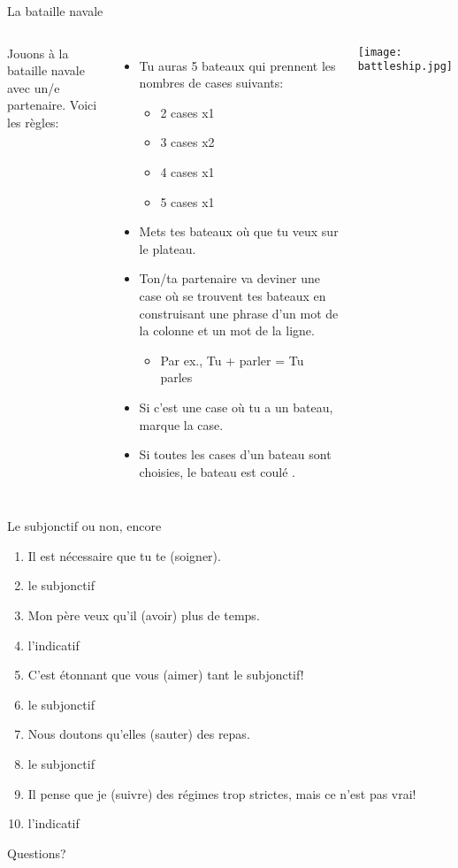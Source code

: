 \documentclass{beamer}
\begin{document}
  \begin{frame}{La bataille navale}
    \scriptsize
    \begin{columns}
        Jouons à la bataille navale avec un/e partenaire.
        Voici les règles:
        \begin{itemize}
          \item Tu auras 5 bateaux qui prennent les nombres de cases  suivants:
          \begin{itemize}
            \scriptsize
            \item 2 cases x1
            \item 3 cases x2
            \item 4 cases x1
            \item 5 cases x1
          \end{itemize}
          \item Mets tes bateaux où que  tu veux sur le plateau.
          \item Ton/ta partenaire va deviner une case où se trouvent tes bateaux en construisant une phrase d'un mot de la colonne et un mot de la ligne.
          \begin{itemize}
            \scriptsize
            \item Par ex., Tu + parler = Tu parles
          \end{itemize}
          \item Si c'est une case où tu a un bateau, marque la case.
          \item Si toutes les cases d'un bateau sont choisies, le bateau est coulé .
          \end{itemize}
        \texttt{[image: battleship.jpg]}
    \end{columns}
  \end{frame}

  \begin{frame}{Le subjonctif ou non, encore}
    \begin{enumerate}
      \item Il est nécessaire que tu te \underline{} (soigner).
      \item<3->[$\to$] le subjonctif
      \item Mon père veux qu'il \underline{} (avoir) plus de temps.
      \item<5->[$\to$] l'indicatif
      \item C'est étonnant que vous \underline{} (aimer) tant le subjonctif!
      \item<7->[$\to$] le subjonctif
      \item Nous doutons qu'elles \underline{} (sauter) des repas.
      \item<9->[$\to$] le subjonctif
      \item Il pense que je \underline{} (suivre) des régimes trop strictes, mais ce n'est pas vrai!
      \item<11->[$\to$] l'indicatif
    \end{enumerate}
  \end{frame}

  \begin{frame}{}
    \begin{center}
      \Large Questions?
    \end{center}
  \end{frame}
\end{document}
